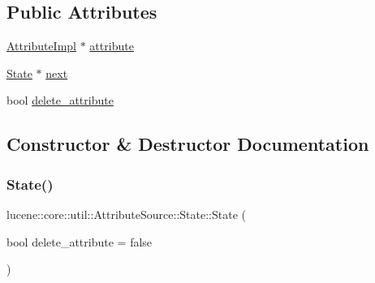 \subsection*{Public Attributes}
\begin{DoxyCompactItemize}
\item 
\mbox{\hyperlink{classlucene_1_1core_1_1util_1_1AttributeImpl}{Attribute\+Impl}} $\ast$ \mbox{\hyperlink{classlucene_1_1core_1_1util_1_1AttributeSource_1_1State_a2a2b8e933ea064322c33f3e52116f39e}{attribute}}
\item 
\mbox{\hyperlink{classlucene_1_1core_1_1util_1_1AttributeSource_1_1State}{State}} $\ast$ \mbox{\hyperlink{classlucene_1_1core_1_1util_1_1AttributeSource_1_1State_af3f4b6f537c2da0ad12260b6ac698da2}{next}}
\item 
bool \mbox{\hyperlink{classlucene_1_1core_1_1util_1_1AttributeSource_1_1State_a295bd737041155f73ff62277a6937926}{delete\+\_\+attribute}}
\end{DoxyCompactItemize}


\subsection{Constructor \& Destructor Documentation}
\mbox{\label{classlucene_1_1core_1_1util_1_1AttributeSource_1_1State_a0a7ca16cd4c6897ed68f26ab0c5fbd98}} 
\subsubsection{\texorpdfstring{State()}{State()}\hspace{0.1cm}{\footnotesize\ttfamily [1/3]}}
{\footnotesize\ttfamily lucene\+::core\+::util\+::\+Attribute\+Source\+::\+State\+::\+State (\begin{DoxyParamCaption}\item[{bool}]{delete\+\_\+attribute = {\ttfamily false} }\end{DoxyParamCaption})\hspace{0.3cm}{\ttfamily [explicit]}}

\mbox{\label{classlucene_1_1core_1_1util_1_1AttributeSource_1_1State_a79a00eace2edc19b09e909936623f876}} 
